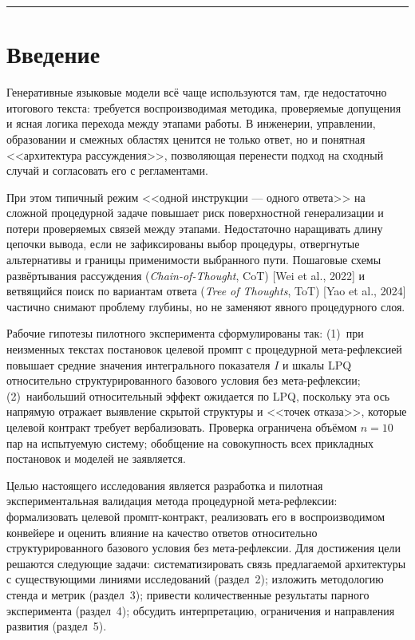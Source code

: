 \documentclass[a4paper,12pt]{article}
\begin{document}
\vspace{1em}
\hrule
\vspace{0.8em}

\section{Введение}

Генеративные языковые модели всё чаще используются там, где недостаточно итогового текста: требуется воспроизводимая методика, проверяемые допущения и ясная логика перехода между этапами работы. В инженерии, управлении, образовании и смежных областях ценится не только ответ, но и понятная <<архитектура рассуждения>>, позволяющая перенести подход на сходный случай и согласовать его с регламентами.

При этом типичный режим <<одной инструкции --- одного ответа>> на сложной процедурной задаче повышает риск поверхностной генерализации и потери проверяемых связей между этапами. Недостаточно наращивать длину цепочки вывода, если не зафиксированы выбор процедуры, отвергнутые альтернативы и границы применимости выбранного пути. Пошаговые схемы развёртывания рассуждения (\textit{Chain-of-Thought}, CoT) [Wei et al., 2022] и ветвящийся поиск по вариантам ответа (\textit{Tree of Thoughts}, ToT) [Yao et al., 2024] частично снимают проблему глубины, но не заменяют явного процедурного слоя.

Рабочие гипотезы пилотного эксперимента сформулированы так: (1)~при неизменных текстах постановок целевой промпт с процедурной мета-рефлексией повышает средние значения интегрального показателя $I$ и шкалы LPQ относительно структурированного базового условия без мета-рефлексии; (2)~наибольший относительный эффект ожидается по LPQ, поскольку эта ось напрямую отражает выявление скрытой структуры и <<точек отказа>>, которые целевой контракт требует вербализовать. Проверка ограничена объёмом $n=10$ пар на испытуемую систему; обобщение на совокупность всех прикладных постановок и моделей не заявляется.

Целью настоящего исследования является разработка и пилотная экспериментальная валидация метода процедурной мета-рефлексии: формализовать целевой промпт-контракт, реализовать его в воспроизводимом конвейере и оценить влияние на качество ответов относительно структурированного базового условия без мета-рефлексии. Для достижения цели решаются следующие задачи: систематизировать связь предлагаемой архитектуры с существующими линиями исследований (раздел~2); изложить методологию стенда и метрик (раздел~3); привести количественные результаты парного эксперимента (раздел~4); обсудить интерпретацию, ограничения и направления развития (раздел~5).
\end{document}
